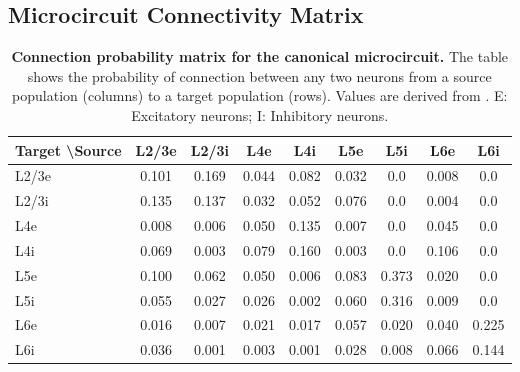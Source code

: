 \documentclass{article}
\begin{document}
\subsection{Microcircuit Connectivity Matrix}
\label{tab:connectivity}
\begin{table}[h]
  \centering
  \caption{%
    \textbf{Connection probability matrix for the canonical microcircuit.}
    The table shows the probability of connection between any two neurons from a source population (columns) to a target population (rows). Values are derived from \citet{Potjans2014}. E: Excitatory neurons; I: Inhibitory neurons.
  }
  \label{tab:connectivity}
  \begin{tabular}{lcccccccc}
    \toprule
    \textbf{Target \textbackslash Source} & \textbf{L2/3e} & \textbf{L2/3i} & \textbf{L4e} & \textbf{L4i} & \textbf{L5e} & \textbf{L5i} & \textbf{L6e} & \textbf{L6i} \\
    \midrule
    L2/3e & 0.101 & 0.169 & 0.044 & 0.082 & 0.032 & 0.0 & 0.008 & 0.0 \\
    L2/3i & 0.135 & 0.137 & 0.032 & 0.052 & 0.076 & 0.0 & 0.004 & 0.0 \\
    L4e & 0.008 & 0.006 & 0.050 & 0.135 & 0.007 & 0.0 & 0.045 & 0.0 \\
    L4i & 0.069 & 0.003 & 0.079 & 0.160 & 0.003 & 0.0 & 0.106 & 0.0 \\
    L5e & 0.100 & 0.062 & 0.050 & 0.006 & 0.083 & 0.373 & 0.020 & 0.0 \\
    L5i & 0.055 & 0.027 & 0.026 & 0.002 & 0.060 & 0.316 & 0.009 & 0.0 \\
    L6e & 0.016 & 0.007 & 0.021 & 0.017 & 0.057 & 0.020 & 0.040 & 0.225 \\
    L6i & 0.036 & 0.001 & 0.003 & 0.001 & 0.028 & 0.008 & 0.066 & 0.144 \\
    \bottomrule
  \end{tabular}
\end{table}

\newpage

\end{document}
